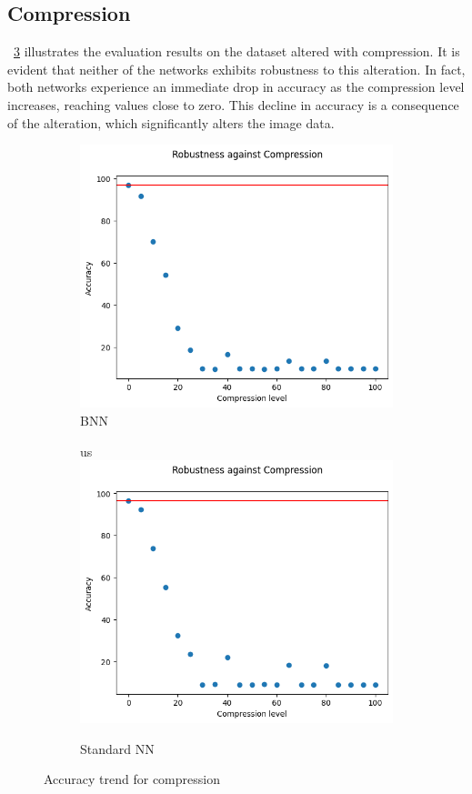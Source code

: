 \subsection{Compression}

\Fig~\ref{fig:acc_co_wu} illustrates the evaluation results on the dataset altered with compression. It is evident that neither of the networks exhibits robustness to this alteration. In fact, both networks experience an immediate drop in accuracy as the compression level increases, reaching values close to zero. This decline in accuracy is a consequence of the alteration, which significantly alters the image data.
\begin{figure}[H]
	\centering
	\begin{subfigure}{.5\textwidth}
		\centering
		\includegraphics[width=0.9\linewidth]{ImageFiles/EvalBNN/CO/WU/acc}
		\caption{BNN}
		\label{fig:co_acc_wu_bnn}
	\end{subfigure}%
	\begin{subfigure}{.5\textwidth}
		\centering
us		\includegraphics[width=0.9\linewidth]{ImageFiles/EvalANN/compr_ann}
		\caption{Standard NN}
		\label{fig:compr_ann}
	\end{subfigure}
	\caption{Accuracy trend for compression}
	\label{fig:acc_co_wu}
\end{figure}

